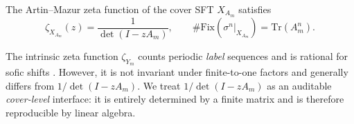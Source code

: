 \begin{proposition}\label{prop:cover-zeta}
The Artin--Mazur zeta function of the cover SFT $X_{A_m}$ satisfies
\[
\zeta_{X_{A_m}}(z)=\frac{1}{\det(I-zA_m)},
\qquad
\#\mathrm{Fix}(\sigma^n|_{X_{A_m}})=\mathrm{Tr}(A_m^n).
\]
\end{proposition}

\begin{remark}\label{rem:intrinsic-vs-cover}
The intrinsic zeta function $\zeta_{Y_m}$ counts periodic \emph{label} sequences and is rational for sofic shifts \cite{Manning1971RationalZeta,Weiss1973SFTandSofic}.
However, it is not invariant under finite-to-one factors and generally differs from $1/\det(I-zA_m)$.
We treat $1/\det(I-zA_m)$ as an auditable \emph{cover-level} interface: it is entirely determined by a finite matrix and is therefore reproducible by linear algebra.
\end{remark}

